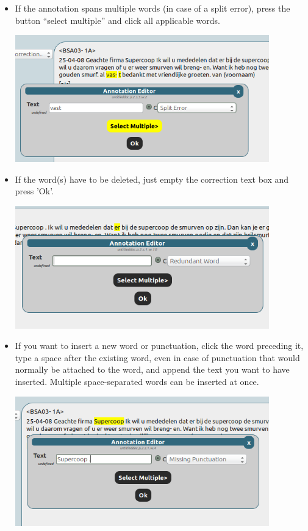 \documentclass[a4paper,11pt]{article}
\begin{document}
\begin{enumerate}
\begin{center}
  \end{center}
\begin{itemize}
  \item If the annotation spans multiple
  words (in case of a split error), press the button ``select multiple'' and
  click all applicable words.
  \begin{center}
    \includegraphics[width=11cm]{editmerge.png}
  \end{center}
  \item If the word(s) have to be deleted, just empty the correction text box
    and press 'Ok'.
  \begin{center}
    \includegraphics[width=11cm]{editdeletion.png}
  \end{center}
  \item If you want to insert a new word or punctuation, click the word
    preceding it, type a space after the existing word, even in case of
    punctuation that would normally be attached to the word, and append the text you
    want to have inserted. Multiple space-separated words can be inserted at
    once.
  \begin{center}
    \includegraphics[width=11cm]{editinsertion.png}

\end{center}
\end{itemize}
\end{enumerate}
\end{document}
